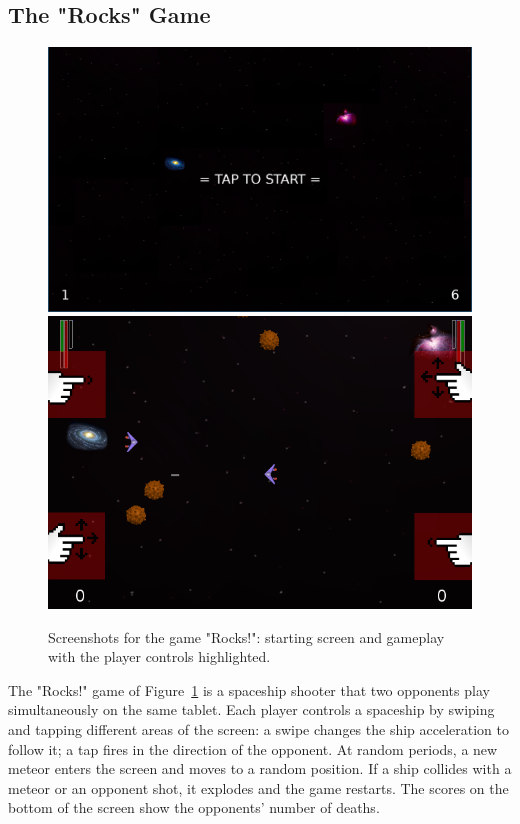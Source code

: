 \documentclass{sigplanconf}
\newcommand{\1}{\;}
\newcommand{\2}{\;\;}
\newcommand{\3}{\;\;\;}
\newcommand{\5}{\;\;\;\;\;}
\begin{document}

\subsection{The "Rocks" Game}

\begin{figure}%
\centering
\includegraphics[scale=0.223]{screen-0.png}
\\
\includegraphics[scale=0.45]{screenshot.png}
\caption{
Screenshots for the game "Rocks!":
starting screen and gameplay with the player controls highlighted.
\label{fig.rocks}
}
\end{figure}

The "Rocks!" game of Figure~\ref{fig.rocks} is a spaceship shooter that two 
opponents play simultaneously on the same tablet.
Each player controls a spaceship by swiping and tapping different areas of the 
screen:
a swipe changes the ship acceleration to follow it;
a tap fires in the direction of the opponent.
At random periods, a new meteor enters the screen and moves to a random 
position.
If a ship collides with a meteor or an opponent shot, it explodes and the game 
restarts.
The scores on the bottom of the screen show the opponents' number of deaths.
\end{document}
